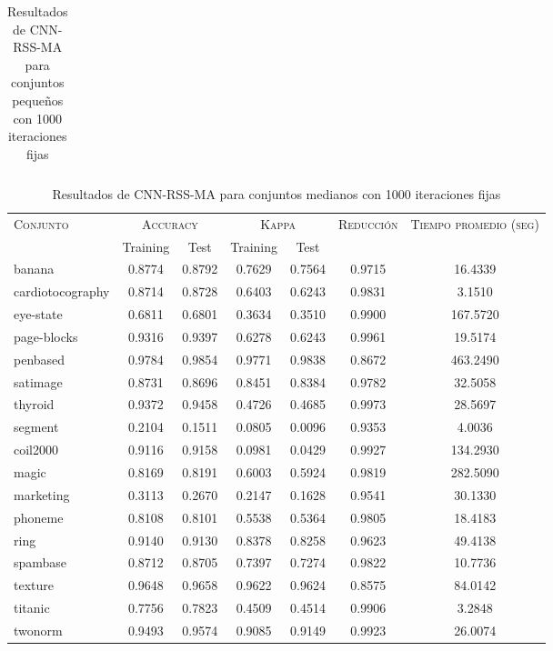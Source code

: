 \begin{table}[]
\begin{tabular}{l c c c c c c}
\hline
\end{tabular}
\caption{Resultados de CNN-RSS-MA para conjuntos pequeños con 1000 iteraciones fijas}
\label{res-peq-CNN-RSS-MA}
\end{table}


\begin{table}[]
\centering
\begin{tabular}{l c c c c c c}
\hline
\multirow{2}{*}{\textsc{Conjunto}}
	& \multicolumn{2}{c}{\textsc{Accuracy}}
	& \multicolumn{2}{c}{\textsc{Kappa}}
	& \textsc{Reducción}
	& \textsc{Tiempo promedio (seg)} \\
	& Training & Test
	& Training & Test \\ 
\hline
\hline

banana & 0.8774 & 0.8792 & 0.7629 & 0.7564 & 0.9715 & 16.4339 \\
cardiotocography & 0.8714 & 0.8728 & 0.6403 & 0.6243 & 0.9831 & 3.1510 \\
eye-state & 0.6811 & 0.6801 & 0.3634 & 0.3510 & 0.9900 & 167.5720 \\
page-blocks & 0.9316 & 0.9397 & 0.6278 & 0.6243 & 0.9961 & 19.5174 \\
penbased & 0.9784 & 0.9854 & 0.9771 & 0.9838 & 0.8672 & 463.2490 \\
satimage & 0.8731 & 0.8696 & 0.8451 & 0.8384 & 0.9782 & 32.5058 \\
thyroid & 0.9372 & 0.9458 & 0.4726 & 0.4685 & 0.9973 & 28.5697 \\
segment & 0.2104 & 0.1511 & 0.0805 & 0.0096 & 0.9353 & 4.0036 \\
coil2000 & 0.9116 & 0.9158 & 0.0981 & 0.0429 & 0.9927 & 134.2930 \\
magic & 0.8169 & 0.8191 & 0.6003 & 0.5924 & 0.9819 & 282.5090 \\
marketing & 0.3113 & 0.2670 & 0.2147 & 0.1628 & 0.9541 & 30.1330 \\
phoneme & 0.8108 & 0.8101 & 0.5538 & 0.5364 & 0.9805 & 18.4183 \\
ring & 0.9140 & 0.9130 & 0.8378 & 0.8258 & 0.9623 & 49.4138 \\
spambase & 0.8712 & 0.8705 & 0.7397 & 0.7274 & 0.9822 & 10.7736 \\
texture & 0.9648 & 0.9658 & 0.9622 & 0.9624 & 0.8575 & 84.0142 \\
titanic & 0.7756 & 0.7823 & 0.4509 & 0.4514 & 0.9906 & 3.2848 \\
twonorm & 0.9493 & 0.9574 & 0.9085 & 0.9149 & 0.9923 & 26.0074 \\

\hline
\end{tabular}
\caption{Resultados de CNN-RSS-MA para conjuntos medianos con 1000 iteraciones fijas}
\label{res-med-CNN-RSS-MA}
\end{table}

